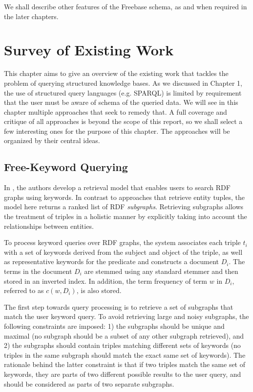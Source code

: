 \documentclass[a4paper, twoside, 12pt]{report}
\begin{document}
We shall describe other features of the Freebase schema, as and when required in the later chapters.



\chapter[Survey]{Survey of Existing Work}

This chapter aims to give an overview of the existing work that tackles the problem of querying structured knowledge bases. As we discussed in Chapter 1, the use of structured query languages (e.g. SPARQL) is limited by requirement that the user must be aware of schema of the queried data. We will see in this chapter multiple approaches that seek to remedy that. A full coverage and critique of all approaches is beyond the scope of this report, so we shall select a few interesting ones for the purpose of this chapter. The approaches will be organized by their central ideas.

\section[Keyword Queries]{Free-Keyword Querying}

 In \cite{elbassuoni2011keyword}, the authors develop a retrieval model that enables users to search RDF graphs using keywords. In contrast to approaches that retrieve entity tuples, the model here returns a ranked list of RDF \emph{subgraphs}. Retrieving subgraphs allows the treatment of triples in a holistic manner by explicitly taking into account the relationships between entities.

 To process keyword queries over RDF graphs, the system associates each triple $t_i$ with a set of keywords derived from the subject and object of the triple, as well as representative keywords for the predicate and constructs a document $D_i$. The terms in the document $D_i$ are stemmed using any standard stemmer and then stored in an inverted index. In addition, the term frequency of term $w$ in $D_i$, referred to as $c(w, D_i)$, is also stored.

 The first step towards query processing is to retrieve a set of subgraphs that match the user keyword query. To avoid retrieving large and noisy subgraphs, the following constraints are imposed: 1) the subgraphs should be unique and maximal (no subgraph should be a subset of any other subgraph retrieved), and 2) the subgraphs should contain triples matching different sets of keywords (no triples in the same subgraph should match the exact same set of keywords). The rationale behind the latter constraint is that if two triples match the same set of keywords, they are parts of two different possible results to the user query, and should be considered as parts of two separate subgraphs.
\end{document}

